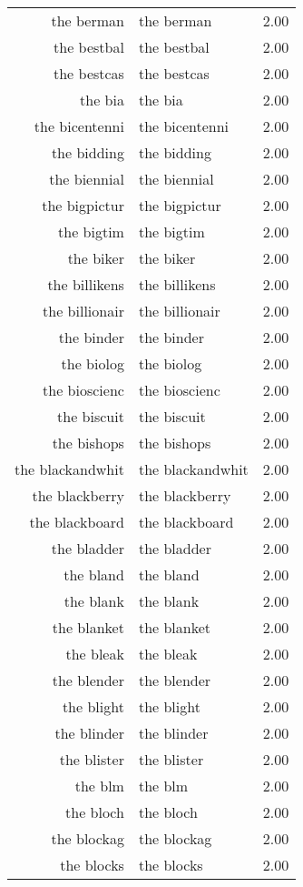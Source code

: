 \begin{table}[ht]
\begin{tabular}{rlr}
  the berman & the berman & 2.00 \\ 
  the bestbal & the bestbal & 2.00 \\ 
  the bestcas & the bestcas & 2.00 \\ 
  the bia & the bia & 2.00 \\ 
  the bicentenni & the bicentenni & 2.00 \\ 
  the bidding & the bidding & 2.00 \\ 
  the biennial & the biennial & 2.00 \\ 
  the bigpictur & the bigpictur & 2.00 \\ 
  the bigtim & the bigtim & 2.00 \\ 
  the biker & the biker & 2.00 \\ 
  the billikens & the billikens & 2.00 \\ 
  the billionair & the billionair & 2.00 \\ 
  the binder & the binder & 2.00 \\ 
  the biolog & the biolog & 2.00 \\ 
  the bioscienc & the bioscienc & 2.00 \\ 
  the biscuit & the biscuit & 2.00 \\ 
  the bishops & the bishops & 2.00 \\ 
  the blackandwhit & the blackandwhit & 2.00 \\ 
  the blackberry & the blackberry & 2.00 \\ 
  the blackboard & the blackboard & 2.00 \\ 
  the bladder & the bladder & 2.00 \\ 
  the bland & the bland & 2.00 \\ 
  the blank & the blank & 2.00 \\ 
  the blanket & the blanket & 2.00 \\ 
  the bleak & the bleak & 2.00 \\ 
  the blender & the blender & 2.00 \\ 
  the blight & the blight & 2.00 \\ 
  the blinder & the blinder & 2.00 \\ 
  the blister & the blister & 2.00 \\ 
  the blm & the blm & 2.00 \\ 
  the bloch & the bloch & 2.00 \\ 
  the blockag & the blockag & 2.00 \\ 
  the blocks & the blocks & 2.00 \\ 

\end{tabular}
\end{table}
